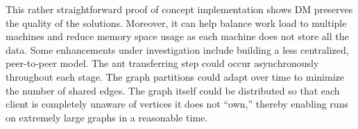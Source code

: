 \documentclass[11pt]{article}
\begin{document}




This rather straightforward proof of concept implementation shows DM preserves the quality of the solutions. Moreover, it can help  balance work load to multiple machines and reduce memory space usage as each machine does not store all the data. Some enhancements under investigation include building a less centralized, peer-to-peer model.  The ant transferring step could occur asynchronously throughout each stage. The graph partitions could adapt over time to minimize the number of shared edges.  The graph itself could be distributed so that each client is completely unaware of vertices it does not ``own,'' thereby enabling runs on extremely large graphs in a reasonable time.









\end{document}
